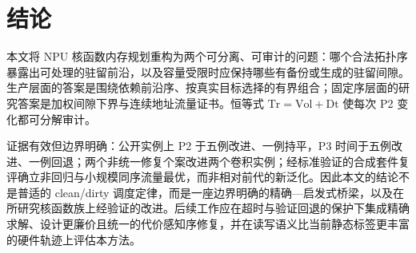 \section{结论}\label{sec:conclusion}
本文将 NPU 核函数内存规划重构为两个可分离、可审计的问题：哪个合法拓扑序暴露出可处理的驻留前沿，以及容量受限时应保持哪些有备份或生成的驻留间隙。生产层面的答案是围绕依赖前沿序、按真实目标选择的有界组合；固定序层面的研究答案是加权间隙下界与连续地址流量证书。恒等式 $\mathrm{Tr}=\mathrm{Vol}+\mathrm{Dt}$ 使每次 P2 变化都可分解审计。

证据有效但边界明确：公开实例上 P2 于五例改进、一例持平，P3 时间于五例改进、一例回退；两个非统一修复个案改进两个卷积实例；经标准验证的合成套件复评确立非回归与小规模同序流量最优，而非相对前代的新泛化。因此本文的结论不是普适的 clean/dirty 调度定律，而是一座边界明确的精确—启发式桥梁，以及在所研究核函数族上经验证的改进。后续工作应在超时与验证回退的保护下集成精确求解、设计更廉价且统一的代价感知序修复，并在读写语义比当前静态标签更丰富的硬件轨迹上评估本方法。
